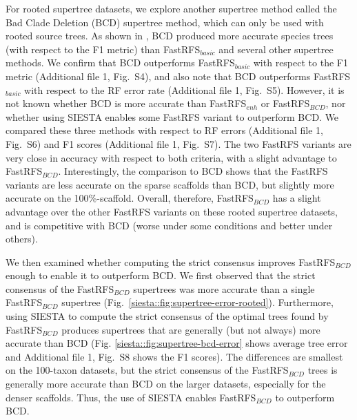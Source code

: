 For rooted supertree datasets, we explore another supertree method called
 the Bad Clade Deletion (BCD) supertree method, which can only be used with rooted source trees.
 As shown in \cite{fleischauer2017bad}, BCD produced more accurate species trees (with respect to the F1 metric) than FastRFS$_{basic}$ and several other supertree methods.
 We confirm that BCD outperforms FastRFS$_{basic}$ with respect to the F1 metric (Additional file 1, Fig.~S4),  and also note that BCD outperforms FastRFS$_{basic}$ with respect to
the RF error rate   (Additional file 1, Fig.~S5).  
However, it is not known whether BCD is more accurate than FastRFS$_{enh}$ or FastRFS$_{BCD}$, nor whether using SIESTA enables some FastRFS variant  to outperform BCD. 
We compared these three methods with respect to RF errors (Additional file 1, Fig.~S6) and F1 scores (Additional file 1, Fig.~S7). 
The two FastRFS variants are very close in accuracy with respect to both criteria, with a slight advantage to FastRFS$_{BCD}$. 
Interestingly, the comparison to BCD shows that the FastRFS variants are less accurate on the sparse scaffolds than BCD, but slightly more accurate on the 100\%-scaffold.
Overall, therefore, FastRFS$_{BCD}$ has a slight advantage over the other FastRFS variants on these rooted supertree datasets, and is competitive with BCD (worse under some conditions
and better under others). 





We then examined whether computing the strict consensus improves FastRFS$_{BCD}$ enough to enable it to outperform BCD.
We first observed that
 the strict consensus of the FastRFS$_{BCD}$ supertrees was more accurate than a single FastRFS$_{BCD}$ supertree (Fig.~\ref{siesta::fig:supertree-error-rooted}).
Furthermore, using SIESTA to compute the strict consensus of the optimal trees found by   FastRFS$_{BCD}$ produces supertrees that are generally (but not always) more accurate than BCD 
(Fig. \ref{siesta::fig:supertree-bcd-error} shows average tree error  and  Additional file 1, Fig.~S8 shows the F1 scores).
The differences are smallest on the 100-taxon datasets, but the strict consensus of the FastRFS$_{BCD}$ trees is generally more
accurate than BCD on the larger datasets, especially for the denser scaffolds.  
Thus,  the use of SIESTA enables FastRFS$_{BCD}$ to outperform BCD.
















